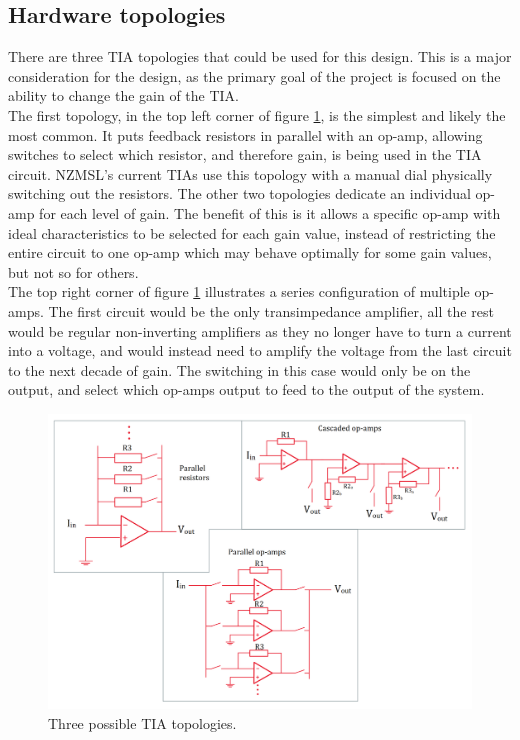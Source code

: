 \documentclass[conference]{IEEEtran}
\begin{document}
\subsection{Hardware topologies}

There are three TIA topologies that could be used for this design. This is a major consideration for the design, as the primary goal of the project is focused on the ability to change the gain of the TIA. \\

The first topology, in the top left corner of figure \ref{fig:3}, is the simplest and likely the most common. It puts feedback resistors in parallel with an op-amp, allowing switches to select which resistor, and therefore gain, is being used in the TIA circuit. NZMSL’s current TIAs use this topology with a manual dial physically switching out the resistors.
The other two topologies dedicate an individual op-amp for each level of gain. The benefit of this is it allows a specific op-amp with ideal characteristics to be selected for each gain value, instead of restricting the entire circuit to one op-amp which may behave optimally for some gain values, but not so for others. \\

The top right corner of figure \ref{fig:3} illustrates a series configuration of multiple op-amps. The first circuit would be the only transimpedance amplifier, all the rest would be regular non-inverting amplifiers as they no longer have to turn a current into a voltage, and would instead need to amplify the voltage from the last circuit to the next decade of gain. The switching in this case would only be on the output, and select which op-amps output to feed to the output of the system.  \\

\begin{figure}
    \centering
    \includegraphics[width=0.8\linewidth]{TopologiesV3.png}
    \caption{Three possible TIA topologies.}
    \label{fig:3}
\end{figure}
\end{document}
